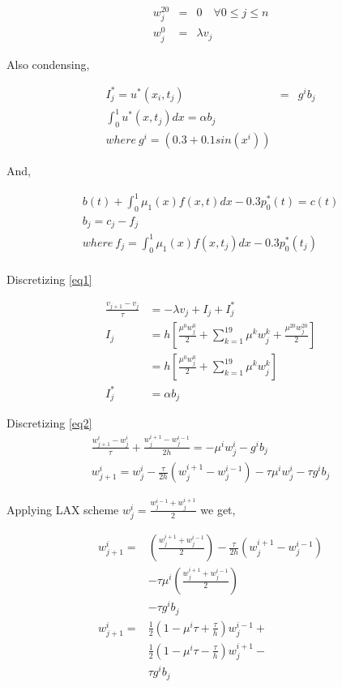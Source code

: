 \documentclass{ifacconf}
\begin{document}
\begin{eqnarray}
w_j^{20} &=& 0 \quad \forall 0\le j\le n\\
w_j^0 &=&  \lambda v_j
\end{eqnarray}

Also condensing,


\begin{eqnarray}
	I_j^{*}=u^{*}(x_i,t_j) &=& g^ib_j \\
\int_0^1 u^{*}(x,t_j)dx = \alpha b_j\\
where\ g^i = (0.3+0.1sin(x^i)) \nonumber
\end{eqnarray}

And,

\begin{eqnarray}
b(t)+\int_0^1\mu_1(x)f(x,t)dx -0.3p_0^{*}(t) = c(t) \nonumber \\
b_j = c_j - f_j \\
where\ f_j = \int_0^1\mu_1(x)f(x,t_j)dx -0.3p_0^{*}(t_j)\\
\end{eqnarray}



Discretizing \eqref{eq1}

\begin{align} \label{eq:disceq1}
\frac{v_{j+1}-v_j}{\tau} &= -\lambda v_j + I_j + I_j^{*} \\
I_j &= h[\frac{\mu^0 w_j^0}{2} + \sum_{k=1}^{19} \mu^k w_j^k + \frac{\mu^{20} w_j^{20}}{2} ] \\
    &=  h[\frac{\mu^0 w_j^0}{2} + \sum_{k=1}^{19} \mu^k w_j^k ] \nonumber \\
I_j^{*} &= \alpha b_j
\end{align}


Discretizing \eqref{eq2}
\begin{align} \label{eq:disceq2}
\frac{w_{j+1}^i-w_{j}^i}{\tau} + \frac{w_j^{i+1}-w_j^{i-1}}{2h} = -\mu^iw_j^i - g^ib_j \nonumber\\
w_{j+1}^i=w_{j}^i-\frac{\tau}{2h}(w_j^{i+1}-w_j^{i-1})-\tau\mu^i w_j^i - \tau g^i b_j
\end{align}

Applying LAX scheme $w_j^i = \frac{w_j^{i-1} + w_j^{i+1}}{2}$ we get,

\begin{align*}
	w^i_{j+1} =& \left( \frac{w_j^{i+1} + w_j^{i-1}}{2} \right)
	-\frac{\tau}{2h}(w_j^{i+1}-w_j^{i-1}) \\
		&-\tau\mu^i\left( \frac{w_j^{i+1} + w_j^{i-1}}{2} \right)  \\
		&- \tau g^i b_j\\
	w^i_{j+1} =& \frac{1}{2}\left( 1-\mu^i\tau + \frac{\tau}{h} \right) w^{i-1}_j + \\
	           & \frac{1}{2}\left( 1-\mu^i\tau - \frac{\tau}{h} \right) w^{i+1}_j - \\
		   & \tau g^i b_j
\end{align*}
\end{document}
